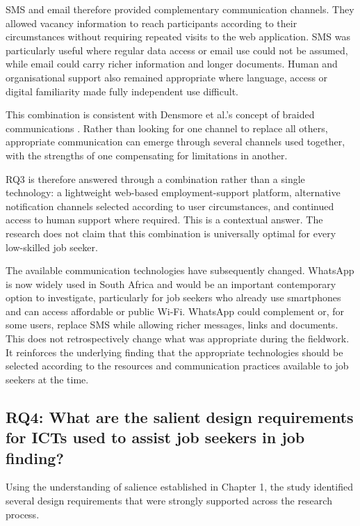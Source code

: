 SMS and email therefore provided complementary communication channels. They allowed vacancy information to reach participants according to their circumstances without requiring repeated visits to the web application. SMS was particularly useful where regular data access or email use could not be assumed, while email could carry richer information and longer documents. Human and organisational support also remained appropriate where language, access or digital familiarity made fully independent use difficult.

This combination is consistent with Densmore et al.'s concept of braided communications \cite{densmore2013}. Rather than looking for one channel to replace all others, appropriate communication can emerge through several channels used together, with the strengths of one compensating for limitations in another.

RQ3 is therefore answered through a combination rather than a single technology: a lightweight web-based employment-support platform, alternative notification channels selected according to user circumstances, and continued access to human support where required. This is a contextual answer. The research does not claim that this combination is universally optimal for every low-skilled job seeker.

The available communication technologies have subsequently changed. WhatsApp is now widely used in South Africa and would be an important contemporary option to investigate, particularly for job seekers who already use smartphones and can access affordable or public Wi-Fi. WhatsApp could complement or, for some users, replace SMS while allowing richer messages, links and documents. This does not retrospectively change what was appropriate during the fieldwork. It reinforces the underlying finding that the appropriate technologies should be selected according to the resources and communication practices available to job seekers at the time.


\subsection{RQ4: What are the salient design requirements for ICTs used to assist job seekers in job finding?}

Using the understanding of salience established in Chapter 1, the study identified several design requirements that were strongly supported across the research process.

